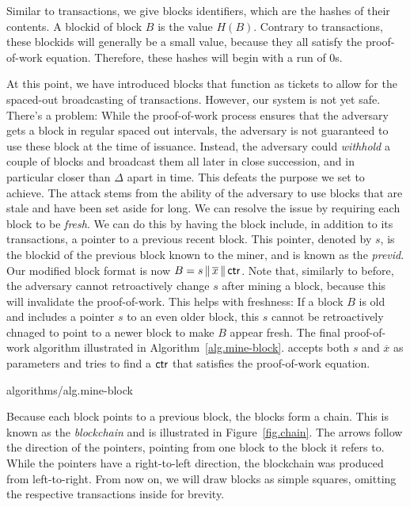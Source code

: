Similar to transactions, we give blocks identifiers, which are the hashes of their contents.
A blockid of block $B$ is the value $H(B)$. Contrary to transactions, these blockids will
generally be a small value, because they all satisfy the proof-of-work equation. Therefore,
these hashes will begin with a run of $0$s.

At this point, we have introduced blocks that function as tickets to allow for the spaced-out
broadcasting of transactions. However, our system is not yet safe. There's a problem: While
the proof-of-work process ensures that the adversary gets a block in regular spaced out
intervals, the adversary is not guaranteed to use these block at the time of issuance.
Instead, the adversary could \emph{withhold} a couple of blocks and broadcast them all later
in close succession, and in particular closer than $\Delta$ apart in time. This defeats the
purpose we set to achieve. The attack stems from the ability of the adversary to use blocks
that are stale and have been set aside for long. We can resolve the issue by requiring
each block to be \emph{fresh}. We can do this by having the block include, in addition to
its transactions, a pointer to a previous recent block. This pointer, denoted by $s$,
is the blockid of the previous block known to the miner, and is known as the \emph{previd}.
Our modified block format is now $B = s \,\|\, \overline{x} \,\|\, \mathsf{ctr}$. Note that,
similarly to before, the adversary cannot retroactively change $s$ after mining a block,
because this will invalidate the proof-of-work. This helps with freshness: If a block $B$ is
old and includes a pointer $s$ to an even older block, this $s$ cannot be retroactively
chnaged to point to a newer block to make $B$ appear fresh. The final proof-of-work algorithm
illustrated in Algorithm~\ref{alg.mine-block}.
accepts both $s$ and $\overline{x}$ as parameters and tries to find a $\mathsf{ctr}$ that
satisfies the proof-of-work equation.

{algorithms/alg.mine-block}

Because each block points to a previous block, the blocks form a chain. This is known
as the \emph{blockchain} and is illustrated in Figure~\ref{fig.chain}.
The arrows follow the direction of the pointers, pointing from one block to the block
it refers to. While the pointers have a right-to-left direction, the blockchain was
produced from left-to-right. From now on, we will draw blocks as simple squares,
omitting the respective transactions inside for brevity.

